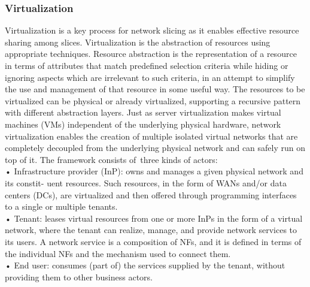 \documentclass{article}
\begin{document}
\subsubsection{Virtualization}
Virtualization is a key process for network slicing
as it enables effective resource sharing among
slices. Virtualization is the abstraction of resources
using appropriate techniques. Resource abstraction is the representation of a resource in terms of
attributes that match predefined selection criteria
while hiding or ignoring aspects which are irrelevant to such criteria, in an attempt to simplify the
use and management of that resource in some
useful way. The resources to be virtualized can
be physical or already virtualized, supporting a
recursive pattern with different abstraction layers.
Just as server virtualization makes virtual
machines (VMs) independent of the underlying
physical hardware, network virtualization enables
the creation of multiple isolated virtual networks that
are completely decoupled from the underlying physical network and can safely run on top of it.
The framework consists of\ three kinds of actors:\\
• Infrastructure provider (InP): owns and manages a given physical network and its constit-
uent resources. Such resources, in the form of
WANs and/or data centers (DCs), are virtualized and then offered through programming
interfaces to a single or multiple tenants.\\
• Tenant: leases virtual resources from one or
more InPs in the form of a virtual network,
where the tenant can realize, manage, and
provide network services to its users. A network service is a composition of NFs, and it
is defined in terms of the individual NFs and
the mechanism used to connect them.\\
• End user: consumes (part of) the services
supplied by the tenant, without providing
them to other business actors.\\
\end{document}
